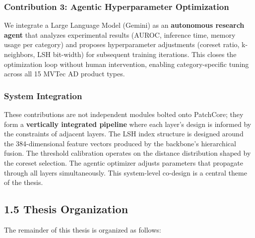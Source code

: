 \documentclass[12pt, a4paper, oneside]{report}
\begin{document}
\subsubsection{Contribution 3: Agentic Hyperparameter Optimization}\label{contribution-3-agentic-hyperparameter-optimization}

We integrate a Large Language Model (Gemini) as an \textbf{autonomous research agent} that analyzes experimental results (AUROC, inference time, memory usage per category) and proposes hyperparameter adjustments (coreset ratio, k-neighbors, LSH bit-width) for subsequent training iterations. This closes the optimization loop without human intervention, enabling category-specific tuning across all 15 MVTec AD product types.

\subsubsection{System Integration}\label{system-integration}

These contributions are not independent modules bolted onto PatchCore; they form a \textbf{vertically integrated pipeline} where each layer's design is informed by the constraints of adjacent layers. The LSH index structure is designed around the 384-dimensional feature vectors produced by the backbone's hierarchical fusion. The threshold calibration operates on the distance distribution shaped by the coreset selection. The agentic optimizer adjusts parameters that propagate through all layers simultaneously. This system-level co-design is a central theme of the thesis.

\subsection{1.5 Thesis Organization}\label{thesis-organization}

The remainder of this thesis is organized as follows:
\end{document}
